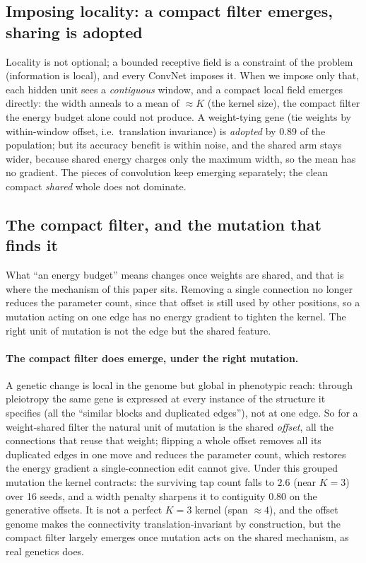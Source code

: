 \documentclass[11pt]{article}
\begin{document}
\subsection{Imposing locality: a compact filter emerges, sharing is adopted}

Locality is not optional; a bounded receptive field is a constraint of the problem (information is
local), and every ConvNet imposes it. When we impose only that, each hidden unit sees a
\emph{contiguous} window, and a compact local field emerges directly: the width anneals to a mean of
$\approx K$ (the kernel size), the compact filter the energy budget alone could not produce. A
weight-tying gene (tie weights by within-window offset, i.e.\ translation invariance) is \emph{adopted}
by $0.89$ of the population; but its accuracy benefit is within noise, and the shared arm stays wider,
because shared energy charges only the maximum width, so the mean has no gradient. The pieces of
convolution keep emerging separately; the clean compact \emph{shared} whole does not dominate.

\subsection{The compact filter, and the mutation that finds it}

What ``an energy budget'' means changes once weights are shared, and that is where the mechanism of this
paper sits. Removing a single connection no longer reduces the parameter count, since that offset is still
used by other positions, so a mutation acting on one edge has no energy gradient to tighten the kernel. The
right unit of mutation is not the edge but the shared feature.

\paragraph{The compact filter does emerge, under the right mutation.} A genetic change is local in the
genome but global in phenotypic reach: through pleiotropy the same gene is expressed at every instance of
the structure it specifies (all the ``similar blocks and duplicated edges''), not at one edge. So for a weight-shared filter the natural unit of mutation is the
shared \emph{offset}, all the connections that reuse that weight; flipping a whole offset removes all its
duplicated edges in one move and reduces the parameter count, which restores the energy gradient a
single-connection edit cannot give. Under this grouped mutation the kernel contracts: the surviving tap
count falls to $2.6$ (near $K=3$) over 16 seeds, and a width penalty sharpens it to contiguity $0.80$ on
the generative offsets. It is not a perfect $K=3$ kernel (span $\approx 4$), and the offset genome makes
the connectivity translation-invariant by construction, but the compact filter largely emerges once
mutation acts on the shared mechanism, as real genetics does.
\end{document}
